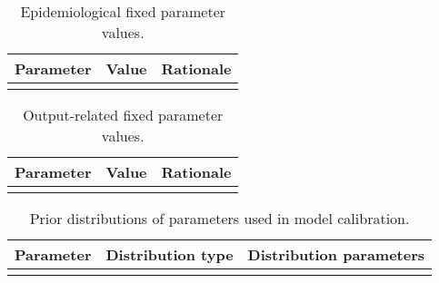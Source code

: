 \documentclass{article}
\begin{document}
\begin{table}[h]
    \begin{tabularx}{\textwidth}{| X | p{2.5cm} | X |}
    \hline
    \textbf{Parameter} & \textbf{Value} & \textbf{Rationale} \\
    \hline
     \\
    \hline
    \end{tabularx}
	\caption{Epidemiological fixed parameter values.}
    \label{tab:fixed_params}
\end{table}

\begin{table}[h]
    \begin{tabularx}{\textwidth}{| X | p{2.5cm} | X |}
    \hline
    \textbf{Parameter} & \textbf{Value} & \textbf{Rationale} \\
    \hline
     \\
    \hline
    \end{tabularx}
	\caption{Output-related fixed parameter values.}
    \label{tab:output_params}
\end{table}

\begin{table}[h]
    \begin{tabularx}{\textwidth}{| X | p{2.5cm} | X |}
    \hline
    \textbf{Parameter} & \textbf{Distribution type} & \textbf{Distribution parameters} \\
    \hline
     \\
    \hline
    \end{tabularx}
	\caption{Prior distributions of parameters used in model calibration.}
    \label{tab:priors}
\end{table}

\newpage
\printbibliography
\end{document}
